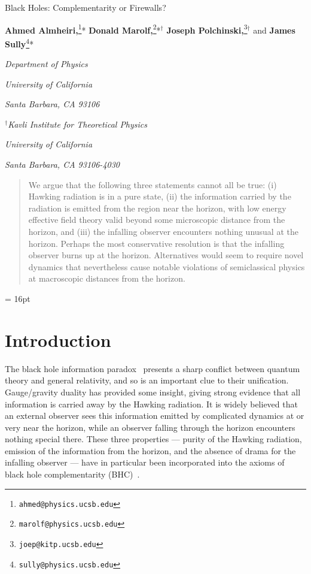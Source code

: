 \documentclass[12pt]{article}
\begin{document}



\begin{titlepage}
\bigskip
\bigskip\bigskip\bigskip
\centerline{\Large Black Holes: Complementarity or Firewalls?}
\bigskip\bigskip\bigskip
\bigskip\bigskip\bigskip

 \centerline{{\bf Ahmed Almheiri,}\footnote{\tt ahmed@physics.ucsb.edu}*
 {\bf Donald Marolf,}\footnote{\tt marolf@physics.ucsb.edu}*${}^\dagger$
 {\bf Joseph Polchinski,}\footnote{\tt joep@kitp.ucsb.edu}${}^\dagger$
 and {\bf James Sully}\footnote{\tt sully@physics.ucsb.edu}*}
\medskip
\centerline{\em *Department of Physics}
\centerline{\em University of California}
\centerline{\em Santa Barbara, CA 93106}
\medskip
\centerline{\em ${}^\dagger$Kavli Institute for Theoretical Physics}
\centerline{\em University of California}
\centerline{\em Santa Barbara, CA 93106-4030}\bigskip
\bigskip\bigskip




\begin{abstract}
We argue that the following three statements cannot all be true: (i)  Hawking radiation is in a pure state, (ii)  the information carried by the radiation is emitted from the region near the horizon, with low energy effective field theory valid beyond some microscopic distance from the horizon, and (iii)  the infalling observer encounters nothing unusual at the horizon.  Perhaps the most conservative resolution is that the infalling observer burns up at the horizon.  Alternatives would seem to require novel dynamics that nevertheless cause notable violations of semiclassical physics at macroscopic distances from the horizon.


\end{abstract}
\end{titlepage}

\baselineskip = 16pt

\tableofcontents

\newpage

\setcounter{footnote}{0}

\section{Introduction}



The black hole information paradox~\cite{Hawking:1976ra} presents a sharp conflict between quantum theory and general relativity, and so is an important clue to their unification.  Gauge/gravity duality has provided some insight, giving strong evidence that all information is carried away by the Hawking radiation.  It is widely believed that an external observer sees this information emitted by complicated dynamics at or very near the horizon, while an observer falling through the horizon encounters nothing special there.  These three properties --- purity of the Hawking radiation, emission of the information from the horizon, and the absence of drama for the infalling observer --- have in particular been incorporated into the axioms of black hole complementarity (BHC)~\cite{Susskind:1993if,Stephens:1993an}.
\end{document}
